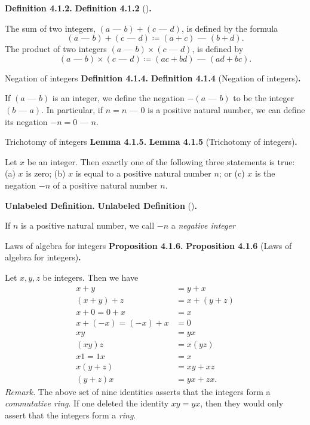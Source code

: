 \documentclass[12pt]{article}
\newcommand{\minus}{\textrm{ --- }}
\newenvironment{df}[2][\relax]{
\vspace{4mm}
    \noindent\setlength{\parskip}{1em}%
    \ifx#1\relax%
        \textbf{#2. }%
    \else%
        \textbf{#2} (#1)\textbf{. }%
    \fi%
    \ignorespaces%
}{}
\theoremstyle{remark}
\begin{document}
\begin{df}{Definition 4.1.2}
    The sum of two integers, $(a \minus b) + (c \minus d)$, is defined by the formula
    \[
        (a \minus b) + (c \minus d) \coloneqq (a + c) \minus (b + d).
    \]
    The product of two integers $(a \minus b) \times (c \minus d)$, is defined by
    {\setlength{\belowdisplayskip}{-10pt} \setlength{\belowdisplayshortskip}{-10pt}
    \[
        (a \minus b) \times (c \minus d) \coloneqq (ac + bd) \minus (ad + bc).
    \]
    }
\end{df}


\begin{df}[Negation of integers]{Definition 4.1.4}
    If $(a \minus b)$ is an integer, we define the negation $-(a \minus b)$ to be the integer $(b \minus a)$.
    In particular, if $n = n \minus 0$ is a positive natural number, we can define its negation $-n = 0 \minus n$.
\end{df}


\begin{df}[Trichotomy of integers]{Lemma 4.1.5}
    Let $x$ be an integer.
    Then exactly one of the following three statements is true:
    (a) $x$ is zero;
    (b) $x$ is equal to a positive natural number $n$; or
    (c) $x$ is the negation $-n$ of a positive natural number $n$.
\end{df}


\begin{df}{Unlabeled Definition}
    If $n$ is a positive natural number, we call $-n$ a \emph{negative integer}
\end{df}


\begin{df}[Laws of algebra for integers]{Proposition 4.1.6}
    Let $x, y, z$ be integers.
    Then we have
    {\setlength{\abovedisplayskip}{0pt}
    \begin{align*}%
        x + y &= y + x \\
        (x + y) + z &= x + (y + z) \\
        x + 0 = 0 + x &= x \\
        x + (-x) = (-x) + x &= 0 \\
        xy &= yx \\
        (xy)z &= x(yz) \\
        x1 = 1x &= x \\
        x(y + z) &= xy + xz \\
        (y + z)x &= yx + zx.%
    \end{align*}%
    }%
    \textit{Remark. } The above set of nine identities asserts that the integers form a \emph{commutative ring}.
    If one deleted the identity $xy = yx$, then they would only assert that the integers form a \emph{ring}.
\end{df}
\end{document}
